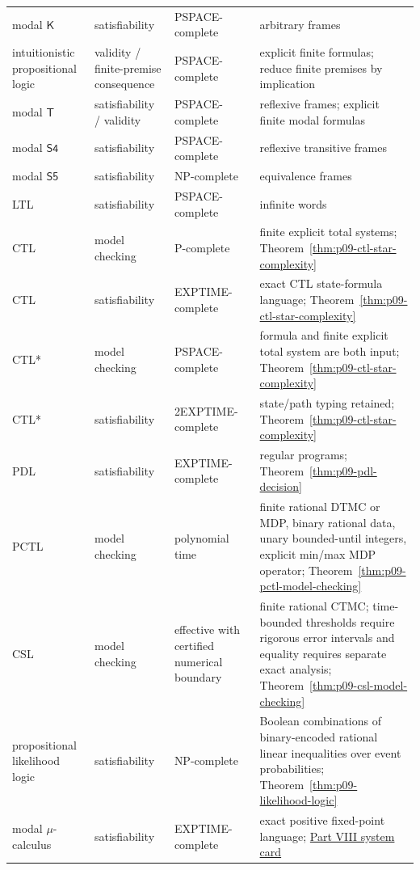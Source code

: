 \begin{longtable}{@{}p{}p{}p{}p{}@{}}
modal \(\mathsf K\) & satisfiability & PSPACE-complete & arbitrary frames \cite{Ladner1977} \\
intuitionistic propositional logic & validity / finite-premise consequence & PSPACE-complete & explicit finite formulas; reduce finite premises by implication \cite{Statman1979} \\
modal \(\mathsf T\) & satisfiability / validity & PSPACE-complete & reflexive frames; explicit finite modal formulas \cite{Ladner1977} \\
modal \(\mathsf{S4}\) & satisfiability & PSPACE-complete & reflexive transitive frames \cite{Ladner1977} \\
modal \(\mathsf{S5}\) & satisfiability & NP-complete & equivalence frames \cite{Ladner1977} \\
LTL & satisfiability & PSPACE-complete & infinite words \cite{SistlaClarke1985} \\
CTL & model checking & P-complete & finite explicit total systems;
Theorem~\ref{thm:p09-ctl-star-complexity} \\
CTL & satisfiability & EXPTIME-complete & exact CTL state-formula language;
Theorem~\ref{thm:p09-ctl-star-complexity} \\
CTL* & model checking & PSPACE-complete & formula and finite explicit total
system are both input; Theorem~\ref{thm:p09-ctl-star-complexity} \\
CTL* & satisfiability & 2EXPTIME-complete & state/path typing retained;
Theorem~\ref{thm:p09-ctl-star-complexity} \\
PDL & satisfiability & EXPTIME-complete & regular programs;
Theorem~\ref{thm:p09-pdl-decision} \\
PCTL & model checking & polynomial time & finite rational DTMC or MDP,
binary rational data, unary bounded-until integers, explicit min/max MDP
operator; Theorem~\ref{thm:p09-pctl-model-checking} \\
CSL & model checking & effective with certified numerical boundary & finite
rational CTMC; time-bounded thresholds require rigorous error intervals and
equality requires separate exact analysis; Theorem~\ref{thm:p09-csl-model-checking} \\
propositional likelihood logic & satisfiability & NP-complete & Boolean
combinations of binary-encoded rational linear inequalities over event
probabilities; Theorem~\ref{thm:p09-likelihood-logic} \\
modal \(\mu\)-calculus & satisfiability & EXPTIME-complete & exact positive
fixed-point language; \hyperref[entry:p08-modal-mu]{Part VIII system card}

\end{longtable}
